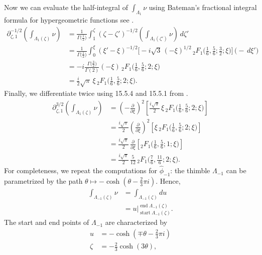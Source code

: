\documentclass{article}
\theoremstyle{definition}
\newcommand{\fracderiv}[3]{\partial^{#1}_{#2, #3}}
\theoremstyle{plain}
\begin{document}
Now we can evaluate the half-integral of $\int_{\Lambda_1} \nu$ using Bateman's fractional integral formula for hypergeometric functions see \cite[Section 4.1]{koornwinder2015fractional}.
\begin{align*}
\fracderiv{-1/2}{\zeta}{1} \left( \int_{\Lambda_1(\zeta)} \nu \right) & = \frac{1}{\Gamma\big(\tfrac{1}{2}\big)} \int_{1}^\zeta (\zeta - \zeta')^{-1/2} \left( \int_{\Lambda_1(\zeta')} \nu \right)\,d\zeta' \\
& = \frac{1}{\Gamma\big(\tfrac{1}{2}\big)} \int_0^\xi  (\xi' - \xi)^{-1/2} \Big[ -{i}{\sqrt{3}}\, (-\xi)^{1/2}\,{}_2F_1\big(\tfrac{1}{6}, \tfrac{5}{6}; \tfrac{3}{2}; \xi\big) \Big] \,\big( -\,d\xi' \big) \\
& = -i \frac{\Gamma\big(\tfrac{3}{2}\big)}{\Gamma(2)} (-\xi)\,{}_2F_1\big(\tfrac{1}{6}, \tfrac{5}{6}; 2; \xi\big) \\
& = \frac{i}{2} \sqrt{\pi}\,\xi\, {}_2F_1\big(\tfrac{1}{6}, \tfrac{5}{6}; 2; \xi\big).
\end{align*}
Finally, we differentiate twice using 15.5.4 and 15.5.1 from \cite{dlmf}.
\begin{align*}
\fracderiv{3/2}{\zeta}{1} \left( \int_{\Lambda_1(\zeta)} \nu \right) & = \left(-\tfrac{\partial}{\partial \xi}\right)^2 \left[ \frac{i\sqrt{\pi}}{2}\,\xi\, {}_2F_1\big(\tfrac{1}{6}, \tfrac{5}{6}; 2; \xi\big) \right] \\
& =  \tfrac{i\sqrt{\pi}}{2} \left(\tfrac{\partial}{\partial \xi}\right)^2 \left[ \xi\,{}_2F_1\big(\tfrac{1}{6}, \tfrac{5}{6}; 2; \xi\big) \right] \\
& = \tfrac{i\sqrt{\pi}}{2}\,\tfrac{\partial}{\partial \xi} \left[ {}_2F_1\big(\tfrac{1}{6}, \tfrac{5}{6}; 1; \xi\big) \right] \\
& = \tfrac{i\sqrt{\pi}}{2}\,\tfrac{5}{12}\, {}_2F_1\big(\tfrac{7}{6}, \tfrac{11}{6}; 2; \xi\big).
\end{align*}
%
For completeness, we repeat the computations for $\hat{\phi}_{-1}$: the thimble $\Lambda_{-1}$ can be parametrized by the path $\theta \mapsto -\cosh(\theta - \tfrac{2}{3}\pi i)$. Hence,
\begin{align*}
\int_{\Lambda_{-1}(\zeta)} \nu & = \int_{\Lambda_{-1}(\zeta)} du \\
& = u \Big|_{\operatorname{start} \Lambda_{-1}(\zeta)}^{\operatorname{end}\Lambda_{-1}(\zeta)}.
\end{align*}
The start and end points of $\Lambda_{-1}$ are characterized by
\begin{align*}
u & = -\cosh(\mp\theta - \tfrac{2}{3}\pi i) \\
\zeta & = -\tfrac{2}{3} \cosh(3\theta),
\end{align*}
\end{document}

